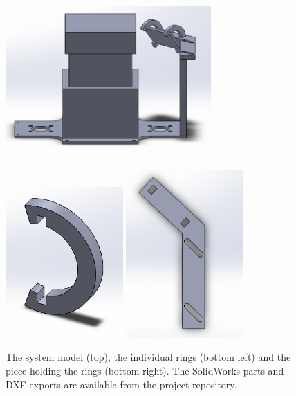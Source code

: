 \documentclass[12pt,oneside,a4paper,draft]{book}
\begin{document}
\begin{figure}
  \centering
  \includegraphics[width=0.7\textwidth]{figs/mirrorassembly}\\
  ~\\
  \includegraphics[width=0.4\textwidth]{figs/mirrorholder}
  \includegraphics[width=0.4\textwidth]{figs/mirrorholdermount}
  \caption{The system model (top), the individual rings (bottom left) and the piece holding the rings (bottom right). The SolidWorks parts and DXF exports are available from the project repository.}
  \label{fig:mirror-solidworks}
\end{figure}
\end{document}

